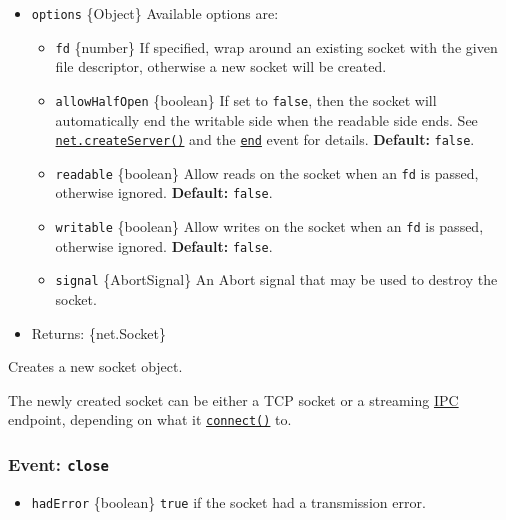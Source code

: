 \begin{itemize}
\tightlist
\item
  \texttt{options} \{Object\} Available options are:

  \begin{itemize}
  \tightlist
  \item
    \texttt{fd} \{number\} If specified, wrap around an existing socket
    with the given file descriptor, otherwise a new socket will be
    created.
  \item
    \texttt{allowHalfOpen} \{boolean\} If set to \texttt{false}, then
    the socket will automatically end the writable side when the
    readable side ends. See
    \hyperref[netcreateserveroptions-connectionlistener]{\texttt{net.createServer()}}
    and the
    \hyperref[event-end]{\texttt{\textquotesingle{}end\textquotesingle{}}}
    event for details. \textbf{Default:} \texttt{false}.
  \item
    \texttt{readable} \{boolean\} Allow reads on the socket when an
    \texttt{fd} is passed, otherwise ignored. \textbf{Default:}
    \texttt{false}.
  \item
    \texttt{writable} \{boolean\} Allow writes on the socket when an
    \texttt{fd} is passed, otherwise ignored. \textbf{Default:}
    \texttt{false}.
  \item
    \texttt{signal} \{AbortSignal\} An Abort signal that may be used to
    destroy the socket.
  \end{itemize}
\item
  Returns: \{net.Socket\}
\end{itemize}

Creates a new socket object.

The newly created socket can be either a TCP socket or a streaming
\hyperref[ipc-support]{IPC} endpoint, depending on what it
\hyperref[socketconnect]{\texttt{connect()}} to.

\subsubsection{\texorpdfstring{Event:
\texttt{\textquotesingle{}close\textquotesingle{}}}{Event: \textquotesingle close\textquotesingle{}}}\label{event-close-1}

\begin{itemize}
\tightlist
\item
  \texttt{hadError} \{boolean\} \texttt{true} if the socket had a
  transmission error.
\end{itemize}

